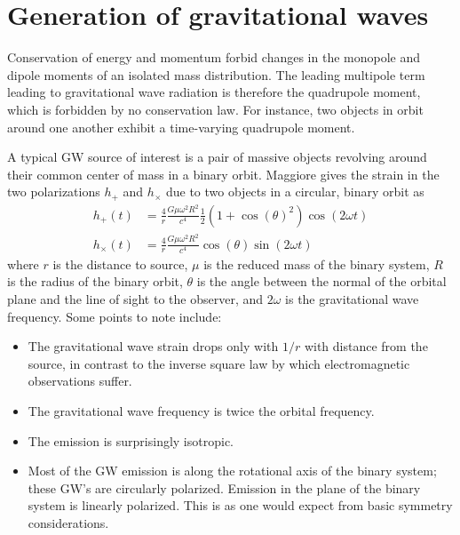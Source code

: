 \section{Generation of gravitational waves}

Conservation of energy and momentum forbid changes in the monopole and
dipole moments of an isolated mass distribution.  The leading
multipole term leading to gravitational wave radiation is therefore
the quadrupole moment, which is forbidden by no conservation law.  For
instance, two objects in orbit around one another exhibit a
time-varying quadrupole moment.


A typical GW source of interest is a pair of massive objects revolving
around their common center of mass in a binary orbit.
Maggiore\cite{Maggiore2008Gravitational} gives the strain in the two
polarizations $h_+$ and $h_\times$ due to two objects in a circular,
binary orbit as
%
\begin{align}
h_+(t)     &= \frac{4}{r} \frac{G \mu \omega^2 R^2}{c^4} \frac{1}{2} (1 + \cos(\theta)^2)  \cos (2 \omega t) \\
h_\times(t) &= \frac{4}{r} \frac{G \mu \omega^2 R^2}{c^4} \cos(\theta) \sin (2 \omega t)
\end{align}
where $r$ is the distance to source, $\mu$ is the reduced mass of the
binary system, $R$ is the radius of the binary orbit, $\theta$ is the
angle between the normal of the orbital plane and the line of sight to
the observer, and $2 \omega$ is the gravitational wave frequency. Some
points to note include:
\begin{itemize}
\item The gravitational wave strain drops only with $1/r$ with distance
  from the source, in contrast to the inverse square law by which
  electromagnetic observations suffer.
\item The gravitational wave frequency is twice the orbital frequency.
\item The emission is surprisingly isotropic.
\item Most of the GW emission is along the rotational axis of the
  binary system; these GW's are circularly polarized.  Emission in the
  plane of the binary system is linearly polarized.  This is as one
  would expect from basic symmetry considerations.
\end{itemize}

